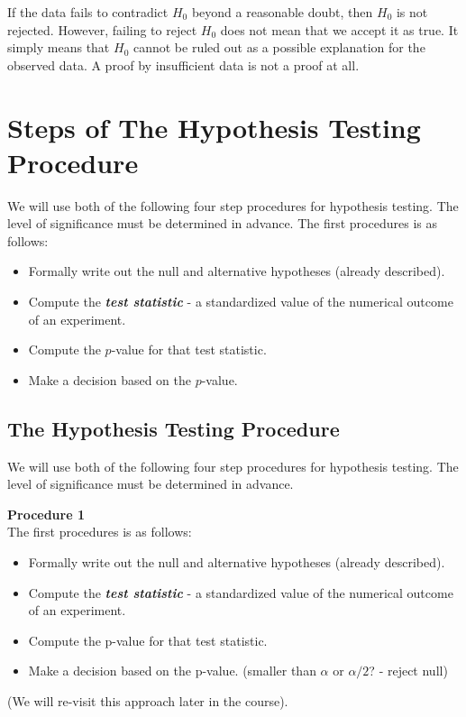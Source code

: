 \documentclass[]{report}
\begin{document}
{If the data fails to contradict $H_0$ beyond a reasonable doubt, then $H_0$ is not rejected. However, failing to reject $H_0$ does not mean that we accept it as true. It simply means that $H_0$ cannot be ruled out as a possible explanation for the observed data. A proof by insufficient data is not a proof at all.




\section{Steps of The Hypothesis Testing Procedure }
We will use both of the following four step procedures for hypothesis testing. The level of significance must be determined in advance. The first procedures is as follows:

\begin{itemize}
\item Formally write out the null and alternative hypotheses (already described).
\item Compute the \emph{\textbf{test statistic}} - a standardized value of the numerical outcome of an experiment.
\item Compute the $p$-value for that test statistic.
\item Make a decision based on the $p$-value.
\end{itemize}


\subsection{The Hypothesis Testing Procedure }
We will use both of the following four step procedures for hypothesis testing. The level of significance must be determined in advance.

\textbf{Procedure 1}\\
The first procedures is as follows:

\begin{itemize}
\item Formally write out the null and alternative hypotheses (already described).
\item Compute the \emph{\textbf{test statistic}} - a standardized value of the numerical outcome of an experiment.
\item Compute the p-value for that test statistic.
\item Make a decision based on the p-value. (smaller than $\alpha$ or $\alpha/2$? - reject null)
\end{itemize}
(We will re-visit this approach later in the course).



}
\end{document}
